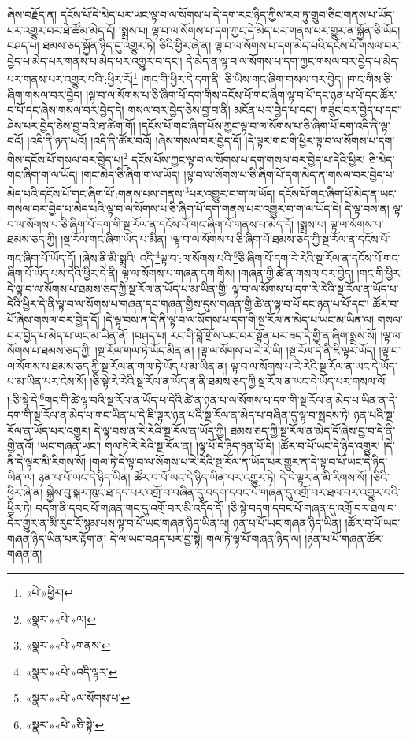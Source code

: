 ཞེས་བརྗོད་ན། དངོས་པོ་དེ་མེད་པར་ཡང་ལྟ་བ་ལ་སོགས་པ་དེ་དག་རང་ཉིད་ཀྱིས་རབ་ཏུ་གྲུབ་ཅིང་གནས་པ་ཡོད་པར་འགྱུར་བར་ཐེ་ཚོམ་མེད་དོ། །སྨྲས་པ། ལྟ་བ་ལ་སོགས་པ་དག་ཀྱང་དེ་མེད་པར་གནས་པར་གྱུར་ན་སྐྱོན་ཅི་ཡོད། བཤད་པ། ཐམས་ཅད་སྐྱོན་ཉིད་དུ་འགྱུར་ཏེ། ཅིའི་ཕྱིར་ཞེ་ན། ལྟ་བ་ལ་སོགས་པ་དག་མེད་པའི་དངོས་པོ་གསལ་བར་བྱེད་པ་མེད་པར་གནས་པ་མེད་པར་འགྱུར་བ་དང་། དེ་མེད་ན་ལྟ་བ་ལ་སོགས་པ་དག་ཀྱང་གསལ་བར་བྱེད་པ་མེད་པར་གནས་པར་འགྱུར་བའི་:ཕྱིར་རོ།\footnote{«པེ་»ཕྱིར།} །གང་གི་ཕྱིར་དེ་དག་ནི། ཅི་ཡིས་གང་ཞིག་གསལ་བར་བྱེད། །གང་གིས་ཅི་ཞིག་གསལ་བར་བྱེད། །ལྟ་བ་ལ་སོགས་པ་ཅི་ཞིག་པོ་དག་གིས་དངོས་པོ་གང་ཞིག་ལྟ་བ་པོ་དང་ཉན་པ་པོ་དང་ཚོར་བ་པོ་དང་ཞེས་གསལ་བར་བྱེད་དེ། གསལ་བར་བྱེད་ཅེས་བྱ་བ་ནི། མངོན་པར་བྱེད་པ་དང་། གཟུང་བར་བྱེད་པ་དང་། ཤེས་པར་བྱེད་ཅེས་བྱ་བའི་ཐ་ཚིག་གོ། །དངོས་པོ་གང་ཞིག་པོས་ཀྱང་ལྟ་བ་ལ་སོགས་པ་ཅི་ཞིག་པོ་དག་འདི་ནི་ལྟ་བའོ། །འདི་ནི་ཉན་པའོ། །འདི་ནི་ཚོར་བའོ། །ཞེས་གསལ་བར་བྱེད་དོ། །དེ་ལྟར་གང་གི་ཕྱིར་ལྟ་བ་ལ་སོགས་པ་དག་གིས་དངོས་པོ་གསལ་བར་བྱེད་པ།\footnote{«སྣར་»«པེ་»ལ།} དངོས་པོས་ཀྱང་ལྟ་བ་ལ་སོགས་པ་དག་གསལ་བར་བྱེད་པ་དེའི་ཕྱིར། ཅི་མེད་གང་ཞིག་ག་ལ་ཡོད། །གང་མེད་ཅི་ཞིག་ག་ལ་ཡོད། །ལྟ་བ་ལ་སོགས་པ་ཅི་ཞིག་པོ་དག་མེད་ན་གསལ་བར་བྱེད་པ་མེད་པའི་དངོས་པོ་གང་ཞིག་པོ་:གནས་པས་གནས་\footnote{«སྣར་»«པེ་»གནས་}པར་འགྱུར་བ་ག་ལ་ཡོད། དངོས་པོ་གང་ཞིག་པོ་མེད་ན་ཡང་གསལ་བར་བྱེད་པ་མེད་པའི་ལྟ་བ་ལ་སོགས་པ་ཅི་ཞིག་པོ་དག་གནས་པར་འགྱུར་བ་ག་ལ་ཡོད་དེ། དེ་ལྟ་བས་ན། ལྟ་བ་ལ་སོགས་པ་ཅི་ཞིག་པོ་དག་གི་སྔ་རོལ་ན་དངོས་པོ་གང་ཞིག་པོ་གནས་པ་མེད་དོ། །སྨྲས་པ། ལྟ་ལ་སོགས་པ་ཐམས་ཅད་ཀྱི། །སྔ་རོལ་གང་ཞིག་ཡོད་པ་མིན། །ལྟ་བ་ལ་སོགས་པ་ཅི་ཞིག་པོ་ཐམས་ཅད་ཀྱི་སྔ་རོལ་ན་དངོས་པོ་གང་ཞིག་པོ་ཡོད་དོ། །ཞེས་ནི་མི་སྨྲའི། འདི་\footnote{«སྣར་»«པེ་»འདི་ལྟར་}ལྟ་བ་:ལ་སོགས་པའི་\footnote{«སྣར་»«པེ་»ལ་སོགས་པ་}ཅི་ཞིག་པོ་དག་རེ་རེའི་སྔ་རོལ་ན་དངོས་པོ་གང་ཞིག་པོ་ཡོད་པས་དེའི་ཕྱིར་དེ་ནི། ལྟ་ལ་སོགས་པ་གཞན་དག་གིས། །གཞན་གྱི་ཚེ་ན་གསལ་བར་བྱེད། །གང་གི་ཕྱིར་དེ་ལྟ་བ་ལ་སོགས་པ་ཐམས་ཅད་ཀྱི་སྔ་རོལ་ན་ཡོད་པ་མ་ཡིན་གྱི། ལྟ་བ་ལ་སོགས་པ་དག་རེ་རེའི་སྔ་རོལ་ན་ཡོད་པ་དེའི་ཕྱིར་དེ་ནི་ལྟ་བ་ལ་སོགས་པ་གཞན་དང་གཞན་གྱིས་དུས་གཞན་གྱི་ཚེ་ན་ལྟ་བ་པོ་དང་ཉན་པ་པོ་དང་། ཚོར་བ་པོ་ཞེས་གསལ་བར་བྱེད་དོ། །དེ་ལྟ་བས་ན་དེ་ནི་ལྟ་བ་ལ་སོགས་པ་དག་གི་སྔ་རོལ་ན་མེད་པ་ཡང་མ་ཡིན་ལ། གསལ་བར་བྱེད་པ་མེད་པ་ཡང་མ་ཡིན་ནོ། །བཤད་པ། རང་གི་བློ་གྲོས་ཡང་བར་སྟོན་པར་ཟད་དེ་གྱི་ན་ཞིག་སྨྲས་སོ། །ལྟ་ལ་སོགས་པ་ཐམས་ཅད་ཀྱི། །སྔ་རོལ་གལ་ཏེ་ཡོད་མིན་ན། །ལྟ་ལ་སོགས་པ་རེ་རེ་ཡི། །སྔ་རོལ་དེ་ནི་ཇི་ལྟར་ཡོད། །ལྟ་བ་ལ་སོགས་པ་ཐམས་ཅད་ཀྱི་སྔ་རོལ་ན་གལ་ཏེ་ཡོད་པ་མ་ཡིན་ན། ལྟ་བ་ལ་སོགས་པ་རེ་རེའི་སྔ་རོལ་ན་ཡང་དེ་ཡོད་པ་མ་ཡིན་པར་ངེས་སོ། །ཅི་སྟེ་རེ་རེའི་སྔ་རོལ་ན་ཡོད་ན་ནི་ཐམས་ཅད་ཀྱི་སྔ་རོལ་ན་ཡང་དེ་ཡོད་པར་གསལ་ལོ། །:ཅི་སྟེ་དེ་\footnote{«སྣར་»«པེ་»ཅི་སྟེ་}གང་གི་ཚེ་ལྟ་བའི་སྔ་རོལ་ན་ཡོད་པ་དེའི་ཚེ་ན་ཉན་པ་ལ་སོགས་པ་དག་གི་སྔ་རོལ་ན་མེད་པ་ཡིན་ན་དེ་དག་གི་སྔ་རོལ་ན་མེད་པ་གང་ཡིན་པ་དེ་ཇི་ལྟར་ཉན་པའི་སྔ་རོལ་ན་མེད་པ་བཞིན་དུ་ལྟ་བ་སྤངས་ཏེ། ཉན་པའི་སྔ་རོལ་ན་ཡོད་པར་འགྱུར། དེ་ལྟ་བས་ན་རེ་རེའི་སྔ་རོལ་ན་ཡོད་ཀྱི། ཐམས་ཅད་ཀྱི་སྔ་རོལ་ན་མེད་དོ་ཞེས་བྱ་བ་དེ་ནི་གྱི་ནའོ། །ཡང་གཞན་ཡང་། གལ་ཏེ་རེ་རེའི་སྔ་རོལ་ན། །ལྟ་པོ་དེ་ཉིད་ཉན་པོ་དེ། །ཚོར་བ་པོ་ཡང་དེ་ཉིད་འགྱུར། །དེ་ནི་དེ་ལྟར་མི་རིགས་སོ། །གལ་ཏེ་དེ་ལྟ་བ་ལ་སོགས་པ་རེ་རེའི་སྔ་རོལ་ན་ཡོད་པར་གྱུར་ན་དེ་ལྟ་བ་པོ་ཡང་དེ་ཉིད་ཡིན་ལ། ཉན་པ་པོ་ཡང་དེ་ཉིད་ཡིན། ཚོར་བ་པོ་ཡང་དེ་ཉིད་ཡིན་པར་འགྱུར་ཏེ། དེ་དེ་ལྟར་ན་མི་རིགས་སོ། །ཅིའི་ཕྱིར་ཞེ་ན། སྐྱེས་བུ་སྐར་ཁུང་ཐ་དད་པར་འགྲོ་བ་བཞིན་དུ་བདག་དབང་པོ་གཞན་དུ་འགྲོ་བར་ཐལ་བར་འགྱུར་བའི་ཕྱིར་ཏེ། བདག་ནི་དབང་པོ་གཞན་གང་དུ་འགྲོ་བར་མི་འདོད་དོ། །ཅི་སྟེ་བདག་དབང་པོ་གཞན་དུ་འགྲོ་བར་ཐལ་བ་དེར་གྱུར་ན་མི་རུང་ངོ་སྙམ་པས་ལྟ་བ་པོ་ཡང་གཞན་ཉིད་ཡིན་ལ། ཉན་པ་པོ་ཡང་གཞན་ཉིད་ཡིན། །ཚོར་བ་པོ་ཡང་གཞན་ཉིད་ཡིན་པར་རྟོག་ན། དེ་ལ་ཡང་བཤད་པར་བྱ་སྟེ། གལ་ཏེ་ལྟ་པོ་གཞན་ཉིད་ལ། །ཉན་པ་པོ་གཞན་ཚོར་གཞན་ན། 